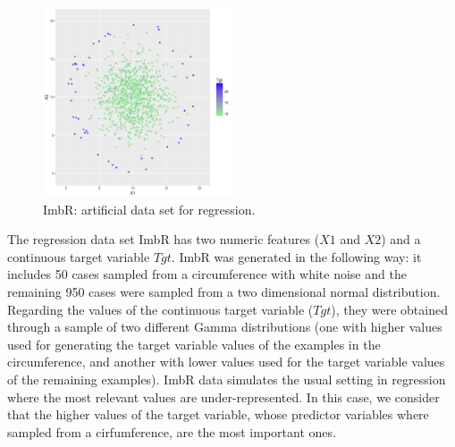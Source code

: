 \documentclass[10pt,a4paper]{article}\usepackage[]{graphicx}\usepackage[]{color}
\newenvironment{knitrout}{}{} %
\begin{document}
\begin{knitrout}\footnotesize
{}\color{fgcolor}\begin{figure}

{\centering \includegraphics[width=0.5\textwidth]{figures/UBL-OriginalR-1} 

}

\caption[ImbR]{ImbR: artificial data set for regression.}\label{fig:OriginalR}
\end{figure}


\end{knitrout}
The regression data set ImbR has two numeric features ($X1$ and $X2$) and a continuous target variable $Tgt$. ImbR was generated in the following way: it includes 50 cases sampled from a circumference with white noise and the remaining 950 cases were sampled from a two dimensional normal distribution. Regarding the values of the continuous target variable ($Tgt$), they were obtained through a sample of two different Gamma distributions (one with higher values used for generating the target variable values of the examples in the circumference, and another with lower values used for the target variable values of the remaining examples). ImbR data simulates the usual setting in regression where the most relevant values are under-represented. In this case, we consider that the higher values of the target variable, whose predictor variables where sampled from a cirfumference, are the most important ones.
\end{document}
